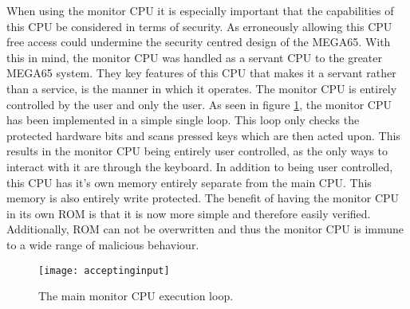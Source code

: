 When using the monitor CPU it is especially important that the capabilities of this CPU be considered in terms of security. As erroneously allowing this CPU free access could undermine the security centred design of the MEGA65. With this in mind, the monitor CPU was handled as a servant CPU to the greater MEGA65 system. They key features of this CPU that makes it a servant rather than a service, is the manner in which it operates. The monitor CPU is entirely controlled by the user and only the user. As seen in figure \ref{fig:acceptinginput}, the monitor CPU has been implemented in a simple single loop. This loop only checks the protected hardware bits and scans pressed keys which are then acted upon. This results in the monitor CPU being entirely user controlled, as the only ways to interact with it are through the keyboard. In addition to being user controlled, this CPU has it's own memory entirely separate from the main CPU. This memory is also entirely write protected. The benefit of having the monitor CPU in its own ROM is that it is now more simple and therefore easily verified. Additionally, ROM can not be overwritten and thus the monitor CPU is immune to a wide range of malicious behaviour.

\begin{figure}
  \centering
  \texttt{[image: acceptinginput]}
  \caption{The main monitor CPU execution loop.}
  \label{fig:acceptinginput}
\end{figure}

